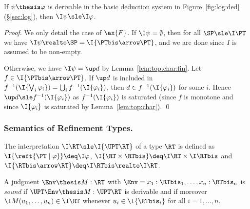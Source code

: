 \begin{proposition}
\label{prop:sem:sound:ded}
If $\psi \thesis \varphi$ is derivable in the basic deduction system 
in Figure~\ref{fig:log:ded} (\S\ref{sec:log}),
then $\I\psi \sle \I\varphi$.
\end{proposition}

\begin{proof}
We only detail the case of $\ax{F}$.
If $\I\psi = \emptyset$, then for all $\SP \sle \I\PT$
we have $\I\psi \realto \SP = \I{\PTbis \arrow \PT}$,
and we are done since $I$ is assumed to be non-empty.

Otherwise, we have $\I\psi = \up d$ by Lemma~\ref{lem:top:char:fin}.
Let $f \in \I{\PTbis \arrow \PT}$.
If $\up d$ is included in
$f^{-1}(\I{\bigvee_i \varphi_i}) = \bigcup_{i} f^{-1}(\I{\varphi_i})$,
then $d \in f^{-1}(\I{\varphi_i})$ for some $i$.
Hence $\up d \sle f^{-1}(\I{\varphi_i})$
as $f^{-1}(\I{\varphi_i})$ is saturated
(since $f$ is monotone and since $\I{\varphi_i}$ is saturated
by Lemma~\ref{lem:top:char}).
\qed
\end{proof}

\subsubsection{Semantics of Refinement Types.}
\label{sec:sem:reft}
The interpretation $\I\RT \sle \I{\UPT\RT}$
of a type $\RT$ is defined as
$\I{\reft{\PT \mid \varphi}} \deq \I\varphi$,
$\I{\RT \times \RTbis} \deq \I\RT \times \I\RTbis$
and
$\I{\RTbis \arrow \RT} \deq \I\RTbis \realto \I\RT$.

\begin{definition}
\label{def:sound:typing}
A judgment $\Env \thesis M : \RT$ with
$\Env = x_1:\RTbis_1,\dots,x_n:\RTbis_n$
is \emph{sound} %
if $\UPT\Env \thesis M :\UPT\RT$ is derivable and
if moreover $\I M(u_1,\dots,u_n) \in \I\RT$
whenever $u_i \in \I{\RTbis_i}$ for all $i =1,\dots,n$.
\end{definition}


